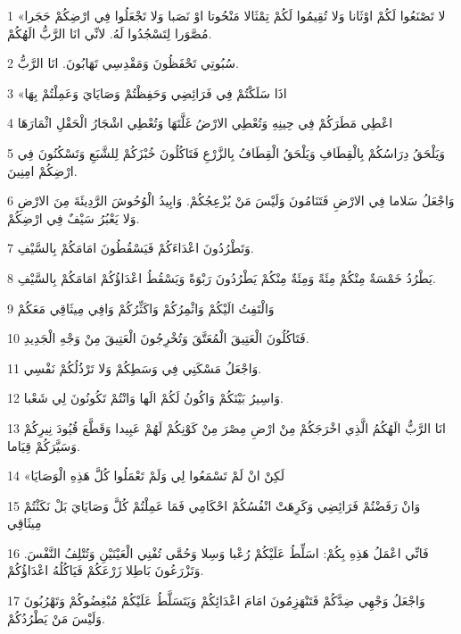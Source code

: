 \par 1 «لا تَصْنَعُوا لَكُمْ اوْثَانا وَلا تُقِيمُوا لَكُمْ تِمْثَالا مَنْحُوتا اوْ نَصَبا وَلا تَجْعَلُوا فِي ارْضِكُمْ حَجَرا مُصَّوَرا لِتَسْجُدُوا لَهُ. لانِّي انَا الرَّبُّ الَهُكُمْ.
\par 2 سُبُوتِي تَحْفَظُونَ وَمَقْدِسِي تَهَابُونَ. انَا الرَّبُّ.
\par 3 «اذَا سَلَكْتُمْ فِي فَرَائِضِي وَحَفِظْتُمْ وَصَايَايَ وَعَمِلْتُمْ بِهَا
\par 4 اعْطِي مَطَرَكُمْ فِي حِينِهِ وَتُعْطِي الارْضُ غَلَّتَهَا وَتُعْطِي اشْجَارُ الْحَقْلِ اثْمَارَهَا
\par 5 وَيَلْحَقُ دِرَاسُكُمْ بِالْقِطَافِ وَيَلْحَقُ الْقِطَافُ بِالزَّرْعِ فَتَاكُلُونَ خُبْزَكُمْ لِلشَّبَعِ وَتَسْكُنُونَ فِي ارْضِكُمْ امِنِينَ.
\par 6 وَاجْعَلُ سَلاما فِي الارْضِ فَتَنَامُونَ وَلَيْسَ مَنْ يُزْعِجُكُمْ. وَابِيدُ الْوُحُوشَ الرَّدِيئَةَ مِنَ الارْضِ وَلا يَعْبُرُ سَيْفٌ فِي ارْضِكُمْ.
\par 7 وَتَطْرُدُونَ اعْدَاءَكُمْ فَيَسْقُطُونَ امَامَكُمْ بِالسَّيْفِ.
\par 8 يَطْرُدُ خَمْسَةٌ مِنْكُمْ مِئَةً وَمِئَةٌ مِنْكُمْ يَطْرُدُونَ رَبْوَةً وَيَسْقُطُ اعْدَاؤُكُمْ امَامَكُمْ بِالسَّيْفِ.
\par 9 وَالْتَفِتُ الَيْكُمْ وَاثْمِرُكُمْ وَاكَثِّرُكُمْ وَافِي مِيثَاقِي مَعَكُمْ
\par 10 فَتَاكُلُونَ الْعَتِيقَ الْمُعَتَّقَ وَتُخْرِجُونَ الْعَتِيقَ مِنْ وَجْهِ الْجَدِيدِ.
\par 11 وَاجْعَلُ مَسْكَنِي فِي وَسَطِكُمْ وَلا تَرْذُلُكُمْ نَفْسِي.
\par 12 وَاسِيرُ بَيْنَكُمْ وَاكُونُ لَكُمْ الَها وَانْتُمْ تَكُونُونَ لِي شَعْبا.
\par 13 انَا الرَّبُّ الَهُكُمُ الَّذِي اخْرَجَكُمْ مِنْ ارْضِ مِصْرَ مِنْ كَوْنِكُمْ لَهُمْ عَبِيدا وَقَطَّعَ قُيُودَ نِيرِكُمْ وَسَيَّرَكُمْ قِيَاما.
\par 14 «لَكِنْ انْ لَمْ تَسْمَعُوا لِي وَلَمْ تَعْمَلُوا كُلَّ هَذِهِ الْوَصَايَا
\par 15 وَانْ رَفَضْتُمْ فَرَائِضِي وَكَرِهَتْ انْفُسُكُمْ احْكَامِي فَمَا عَمِلْتُمْ كُلَّ وَصَايَايَ بَلْ نَكَثْتُمْ مِيثَاقِي
\par 16 فَانِّي اعْمَلُ هَذِهِ بِكُمْ: اسَلِّطُ عَلَيْكُمْ رُعْبا وَسِلا وَحُمَّى تُفْنِي الْعَيْنَيْنِ وَتُتْلِفُ النَّفْسَ. وَتَزْرَعُونَ بَاطِلا زَرْعَكُمْ فَيَاكُلُهُ اعْدَاؤُكُمْ.
\par 17 وَاجْعَلُ وَجْهِي ضِدَّكُمْ فَتَنْهَزِمُونَ امَامَ اعْدَائِكُمْ وَيَتَسَلَّطُ عَلَيْكُمْ مُبْغِضُوكُمْ وَتَهْرُبُونَ وَلَيْسَ مَنْ يَطْرُدُكُمْ.
